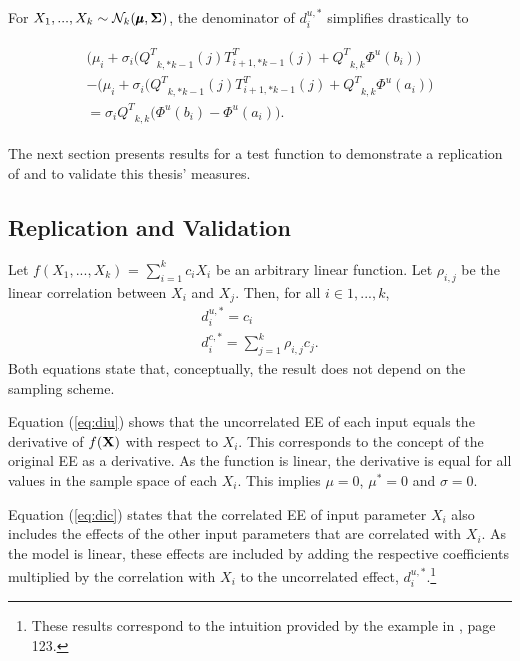 \documentclass[a4paper,12pt]{article}
\begin{document}
For $X_1, ..., X_k \sim \mathcal{N}_k(\pmb{\mu}, \bold{\Sigma})$, the denominator of $d_i^{u,*}$ simplifies drastically to

\begin{align}
\begin{split}
 \big(\mu_i + \sigma_i\big({Q^T}_{k,*k-1}(j)T_{i+1,*k-1}^T(j) + {Q^T}_{k,k} \Phi^u(b_i)\big) \\-  \big(\mu_i + \sigma_i\big({Q^T}_{k,*k-1}(j)T_{i+1,*k-1}^T(j) + {Q^T}_{k,k} \Phi^u(a_i)\big)\\= \sigma_i{Q^T}_{k,k}\big(\Phi^u(b_i)-\Phi^u(a_i)\big).
 \end{split}
\end{align}

\noindent
The next section presents results for a test function to demonstrate a replication of \cite{ge2017extending} and to validate this thesis' measures.

\subsection{Replication and Validation}

Let $f(X_1, ..., X_k)$ = $\sum_{i = 1}^{k} c_i X_i$ be an arbitrary linear function. Let $\rho_{i,j}$ be the linear correlation between $X_i$ and $X_j$. Then, for all $i \in 1, ..., k$,
\begin{align}
d_i^{u,*} = c_i \label{eq:diu}\\
d_i^{c,*} = \sum_{j = 1}^{k} \rho_{i,j} c_{j}. \label{eq:dic}
\end{align}
Both equations state that, conceptually, the result does not depend on the sampling scheme.

Equation (\ref{eq:diu}) shows that the uncorrelated EE of each input equals the derivative of $f(\bold{X})$ with respect to $X_i$. This corresponds to the concept of the original EE as a derivative. As the function is linear, the derivative is equal for all values in the sample space of each $X_i$. This implies $\mu=0$, $\mu^*=0 $ and $ \sigma=0$.

Equation (\ref{eq:dic}) states that the correlated EE of input parameter $X_i$ also includes the effects of the other input parameters that are correlated with $X_i$. As the model is linear, these effects are included by adding the respective coefficients multiplied by the correlation with $X_i$ to the uncorrelated effect, $d_i^{u,*}$.\footnote{These results correspond to the intuition provided by the example in \cite{Saltelli.2008}, page 123.}\\
\end{document}
